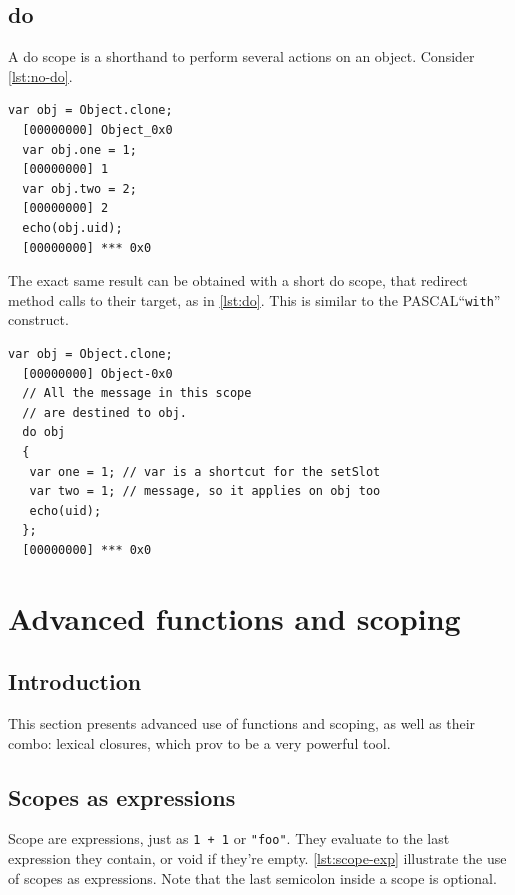 \documentclass[openright,twoside,12pt]{report}
\newcommand{\pascal}{PASCAL\xspace}
\newcommand{\lst}[1]{\autoref{lst:#1}}
\begin{document}
\section{do}
\label{section:constructs/do}

A do scope is a shorthand to perform several actions on an
object. Consider \lst{no-do}.

\begin{lstlisting}[caption=Lot of code bloat,label=lst:no-do]
  var obj = Object.clone;
  [00000000] Object_0x0
  var obj.one = 1;
  [00000000] 1
  var obj.two = 2;
  [00000000] 2
  echo(obj.uid);
  [00000000] *** 0x0
\end{lstlisting}

The exact same result can be obtained with a short do scope, that
redirect method calls to their target, as in \lst{do}. This is similar
to the \pascal ``\texttt{with}'' construct.


\begin{lstlisting}[caption=Shorter with a do block,label=lst:do]
  var obj = Object.clone;
  [00000000] Object-0x0
  // All the message in this scope
  // are destined to obj.
  do obj
  {
   var one = 1; // var is a shortcut for the setSlot
   var two = 1; // message, so it applies on obj too
   echo(uid);
  };
  [00000000] *** 0x0
\end{lstlisting}



\chapter{Advanced functions and scoping}

\section{Introduction}

This section presents advanced use of functions and scoping, as well
as their combo: lexical closures, which prov to be a very powerful
tool.

\section{Scopes as expressions}

Scope are expressions, just as \lstinline|1 + 1| or \lstinline|"foo"|.
They evaluate to the last expression they contain, or void if they're
empty. \lst{scope-exp} illustrate the use of scopes as
expressions. Note that the last semicolon inside a scope is optional.
\end{document}

